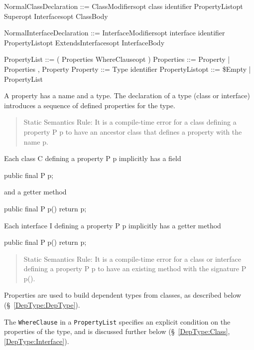 \begin{x10}
NormalClassDeclaration ::= 
   ClassModifiersopt class identifier 
   PropertyListopt Superopt Interfacesopt ClassBody

NormalInterfaceDeclaration ::= 
   InterfaceModifiersopt interface identifier 
   PropertyListopt ExtendsInterfacesopt InterfaceBody

PropertyList     ::= ( Properties WhereClauseopt )
Properties       ::= Property
                 | Properties , Property
Property         ::= Type identifier    
PropertyListopt  ::= \$Empty | PropertyList
\end{x10}


A property has a name and a type. The declaration of a type (class or
interface) introduces a sequence of defined properties for the
type. 

\begin{quotation}
   {\sc Static Semantics Rule:} It is a compile-time error for a class
  defining a property {\cf P p} to have an ancestor class that defines a property
  with the name {\cf p}.  
\end{quotation}


Each class {\cf C} defining a property {\cf P p} implicitly has a field

\begin{x10}
public final P p;  
\end{x10}

\noindent and a getter method 

\begin{x10}
public final P p() { return p;}  
\end{x10}

\noindent Each interface {\cf I} defining a property {\cf P p} implicitly has a getter method

\begin{x10}
public final P p() { return p;}
\end{x10}

\begin{quotation}
  {\sc Static Semantics Rule:} It is a compile-time error for a class or
  interface defining a property {\cf P p} to have an existing method with
  the signature {\cf P p()}.   
\end{quotation}


Properties are used to build dependent types from classes, as
described below (\S~\ref{DepType:DepType}).

The {\tt WhereClause} in a {\tt PropertyList} specifies an explicit
condition on the properties of the type, and is discussed further
below (\S~\ref{DepType:Class}, \ref{DepType:Interface}).

